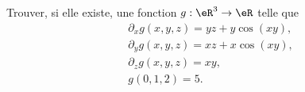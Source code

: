 \begin{exercice}\label{exoGeomAnal-0031}

Trouver, si elle existe, une fonction $g: \eR^3\to\eR$ telle que 
\begin{equation}
  \begin{aligned}
    &\partial_xg(x,y,z)= yz+y\cos(xy), \\
    &\partial_yg(x,y,z)=  xz+x\cos(xy),\\
    &\partial_zg(x,y,z)=xy,\\
    & g(0,1,2) =5.
  \end{aligned}
\end{equation}


\end{exercice}
